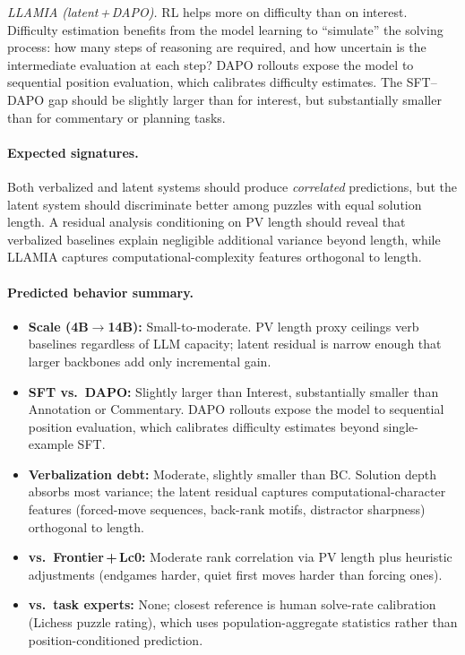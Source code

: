 \emph{LLAMIA (latent\,+\,DAPO).}
RL helps more on difficulty than on interest.
Difficulty estimation benefits from the model learning to ``simulate'' the
solving process: how many steps of reasoning are required, and how
uncertain is the intermediate evaluation at each step?
DAPO rollouts expose the model to sequential position evaluation, which
calibrates difficulty estimates.
The SFT--DAPO gap should be slightly larger than for interest, but
substantially smaller than for commentary or planning tasks.

\paragraph{Expected signatures.}
Both verbalized and latent systems should produce \emph{correlated}
predictions, but the latent system should discriminate better among puzzles
with equal solution length.
A residual analysis conditioning on PV length should reveal that verbalized
baselines explain negligible additional variance beyond length, while LLAMIA
captures computational-complexity features orthogonal to length.

\paragraph{Predicted behavior summary.}
\begin{itemize}[leftmargin=*, itemsep=2pt, topsep=2pt]
\item \textbf{Scale (4B${\to}$14B):} Small-to-moderate.
  PV length proxy ceilings verb baselines regardless of LLM capacity;
  latent residual is narrow enough that larger backbones add only
  incremental gain.
\item \textbf{SFT vs.\ DAPO:} Slightly larger than Interest,
  substantially smaller than Annotation or Commentary.
  DAPO rollouts expose the model to sequential position evaluation,
  which calibrates difficulty estimates beyond single-example SFT.
\item \textbf{Verbalization debt:} Moderate, slightly smaller than BC.
  Solution depth absorbs most variance; the latent residual captures
  computational-character features (forced-move sequences, back-rank
  motifs, distractor sharpness) orthogonal to length.
\item \textbf{vs.\ Frontier\,+\,Lc0:} Moderate rank correlation via
  PV length plus heuristic adjustments (endgames harder, quiet first
  moves harder than forcing ones).
\item \textbf{vs.\ task experts:} None; closest reference is human
  solve-rate calibration (Lichess puzzle rating), which uses
  population-aggregate statistics rather than position-conditioned
  prediction.
\end{itemize}

